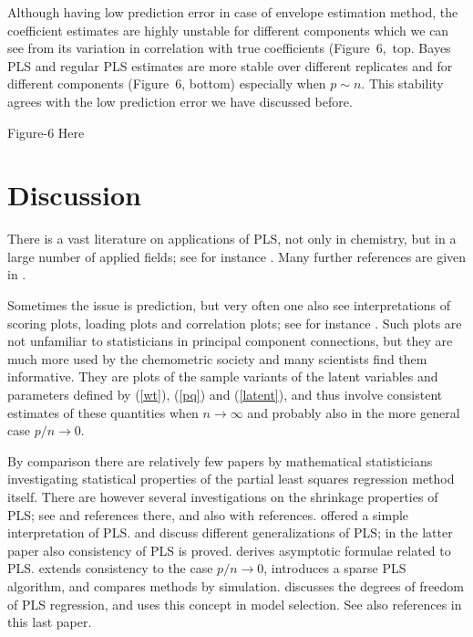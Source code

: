 \documentclass[a4paper, 11pt]{article}
\begin{document}
Although having low prediction error in case of envelope estimation method, the coefficient estimates are highly unstable for different components which we can see from its variation in correlation with true coefficients (Figure~6,~top. Bayes PLS and regular PLS estimates are more stable over different replicates and for different components (Figure~6, bottom) especially when $p\sim n$. This stability agrees with the low prediction error we have discussed before.

\begin{center}
 Figure-6 Here 
\end{center}


\section{Discussion}
There is a vast literature on applications of PLS, not only in chemistry, but in a large number of applied fields; see for instance \citet{boulesteix2007partial}. Many further references are given in \citet{mehmood2016diversity}.

Sometimes the issue is prediction, but very often one also see interpretations of scoring plots, loading plots and correlation plots; see for instance \citet{martens2001multivariate}. Such plots are not unfamiliar to statisticians in principal component connections, but they are much more used by the chemometric society and many scientists find them informative. They are plots of the sample variants of the latent variables and parameters defined by (\ref{wt}), (\ref{pq}) and (\ref{latent}), and thus involve consistent estimates of these quantities when $n\rightarrow\infty$ and probably also in the more general case $p/n\rightarrow 0$.

By comparison there are relatively few papers by mathematical statisticians
investigating statistical properties of the partial least squares regression
method itself. There are however several investigations on the shrinkage
properties of PLS; see \citet{kramer2007overview} and references there, and also \citet{foschigeometry} with references. \citet{garthwaite1994interpretation} offered a simple interpretation of PLS. \citet{stone1990continuum} and \citet{naik2000partial} discuss different generalizations of PLS; in the latter paper also consistency of PLS is proved. \citet{stoica1998partial} derives asymptotic formulae related to PLS. \citet{chun2010sparse} extends consistency to the case $p/n\rightarrow 0$, introduces a sparse PLS algorithm, and compares methods by simulation. \citet{kramer2012degrees} discusses the degrees of freedom of PLS regression, and uses this concept in model selection. See also references in this last paper.
\end{document}
